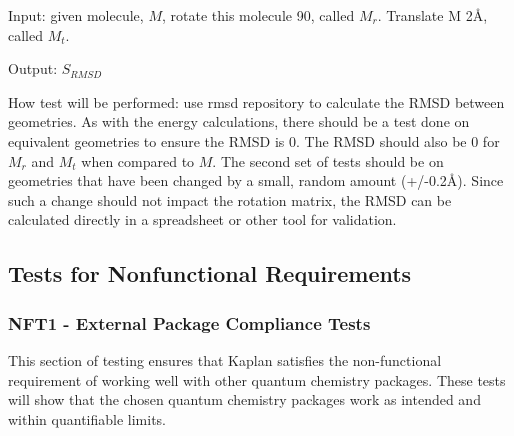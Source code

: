 \documentclass[12pt, titlepage]{article}
\newcommand{\progname}{Kaplan} %
\begin{document}
\begin{enumerate}
	Input: given molecule, $M$, rotate this molecule 90\textdegree, called 
	$M_r$. Translate M 2\si{\angstrom}, called $M_t$. 
	
	Output: $S_{RMSD}$
	
	How test will be performed: use rmsd repository to calculate the RMSD 
	between geometries. As with the energy calculations, there should be a test 
	done on equivalent geometries to ensure the RMSD is 0. The RMSD should also 
	be 0 for $M_r$ and $M_t$ when compared to $M$. The second set of tests 
	should be on geometries that have been changed by a small, random amount 
	(+/-0.2\si{\angstrom}). Since such a change should not impact the rotation 
	matrix, the RMSD can be calculated directly in a spreadsheet or other tool 
	for validation.

	
\end{enumerate}

\subsection{Tests for Nonfunctional Requirements}

\subsubsection{NFT1 - External Package Compliance Tests}

This section of testing ensures that \progname{} satisfies the non-functional 
requirement of working well with other quantum chemistry packages. These tests 
will show that the chosen quantum chemistry packages work as intended and 
within quantifiable limits.
\end{document}
